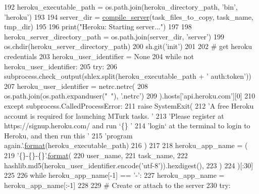 \begin{DoxyCode}
192     heroku\_executable\_path = os.path.join(heroku\_directory\_path, \textcolor{stringliteral}{'bin'}, \textcolor{stringliteral}{'heroku'})
193 
194     server\_dir = \hyperlink{namespaceparlai_1_1mturk_1_1core_1_1dev_1_1server__utils_ab2ee72bd56197de749229032b05254da}{compile\_server}(task\_files\_to\_copy, task\_name, tmp\_dir)
195 
196     print(\textcolor{stringliteral}{"Heroku: Starting server..."})
197 
198     heroku\_server\_directory\_path = os.path.join(server\_dir, \textcolor{stringliteral}{'server'})
199     os.chdir(heroku\_server\_directory\_path)
200     sh.git(\textcolor{stringliteral}{'init'})
201 
202     \textcolor{comment}{# get heroku credentials}
203     heroku\_user\_identifier = \textcolor{keywordtype}{None}
204     \textcolor{keywordflow}{while} \textcolor{keywordflow}{not} heroku\_user\_identifier:
205         \textcolor{keywordflow}{try}:
206             subprocess.check\_output(shlex.split(heroku\_executable\_path + \textcolor{stringliteral}{' auth:token'}))
207             heroku\_user\_identifier = netrc.netrc(
208                 os.path.join(os.path.expanduser(\textcolor{stringliteral}{"~"}), \textcolor{stringliteral}{'.netrc'})
209             ).hosts[\textcolor{stringliteral}{'api.heroku.com'}][0]
210         \textcolor{keywordflow}{except} subprocess.CalledProcessError:
211             \textcolor{keywordflow}{raise} SystemExit(
212                 \textcolor{stringliteral}{'A free Heroku account is required for launching MTurk tasks. '}
213                 \textcolor{stringliteral}{'Please register at https://signup.heroku.com/ and run `\{\} '}
214                 \textcolor{stringliteral}{'login` at the terminal to login to Heroku, and then run this '}
215                 \textcolor{stringliteral}{'program again.'}.\hyperlink{namespaceparlai_1_1chat__service_1_1services_1_1messenger_1_1shared__utils_a32e2e2022b824fbaf80c747160b52a76}{format}(heroku\_executable\_path)
216             )
217 
218     heroku\_app\_name = (
219         \textcolor{stringliteral}{'\{\}-\{\}-\{\}'}.\hyperlink{namespaceparlai_1_1chat__service_1_1services_1_1messenger_1_1shared__utils_a32e2e2022b824fbaf80c747160b52a76}{format}(
220             user\_name,
221             task\_name,
222             hashlib.md5(heroku\_user\_identifier.encode(\textcolor{stringliteral}{'utf-8'})).hexdigest(),
223         )
224     )[:30]
225 
226     \textcolor{keywordflow}{while} heroku\_app\_name[-1] == \textcolor{stringliteral}{'-'}:
227         heroku\_app\_name = heroku\_app\_name[:-1]
228 
229     \textcolor{comment}{# Create or attach to the server}
230     \textcolor{keywordflow}{try}:

\end{DoxyCode}
